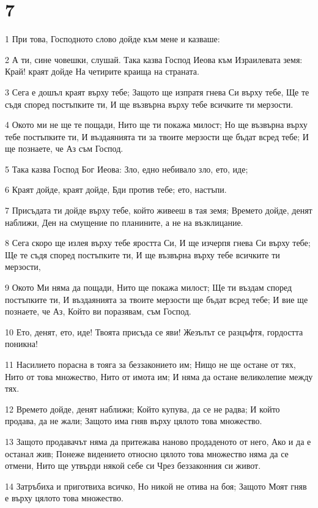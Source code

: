 \chapter{7}

\par 1 При това, Господното слово дойде към мене и казваше:
\par 2 А ти, сине човешки, слушай. Така казва Господ Иеова към Израилевата земя: Край! краят дойде На четирите краища на страната.
\par 3 Сега е дошъл краят върху тебе; Защото ще изпратя гнева Си върху тебе, Ще те съдя според постъпките ти, И ще възвърна върху тебе всичките ти мерзости.
\par 4 Окото ми не ще те пощади, Нито ще ти покажа милост; Но ще възвърна върху тебе постъпките ти, И въздаянията ти за твоите мерзости ще бъдат всред тебе; И ще познаете, че Аз съм Господ.
\par 5 Така казва Господ Бог Иеова: Зло, едно небивало зло, ето, иде;
\par 6 Краят дойде, краят дойде, Бди против тебе; ето, настъпи.
\par 7 Присъдата ти дойде върху тебе, който живееш в тая земя; Времето дойде, денят наближи, Ден на смущение по планините, а не на възклицание.
\par 8 Сега скоро ще излея върху тебе яростта Си, И ще изчерпя гнева Си върху тебе; Ще те съдя според постъпките ти, И ще възвърна върху тебе всичките ти мерзости,
\par 9 Окото Ми няма да пощади, Нито ще покажа милост; Ще ти въздам според постъпките ти, И въздаянията за твоите мерзости ще бъдат всред тебе; И вие ще познаете, че Аз, Който ви поразявам, съм Господ.
\par 10 Ето, денят, ето, иде! Твоята присъда се яви! Жезълът се разцъфтя, гордостта поникна!
\par 11 Насилието порасна в тояга за беззаконието им; Нищо не ще остане от тях, Нито от това множество, Нито от имота им; И няма да остане великолепие между тях.
\par 12 Времето дойде, денят наближи; Който купува, да се не радва; И който продава, да не жали; Защото има гняв върху цялото това множество.
\par 13 Защото продавачът няма да притежава наново продаденото от него, Ако и да е останал жив; Понеже видението относно цялото това множество няма да се отмени, Нито ще утвърди някой себе си Чрез беззаконния си живот.
\par 14 Затръбиха и приготвиха всичко, Но никой не отива на боя; Защото Моят гняв е върху цялото това множество.
